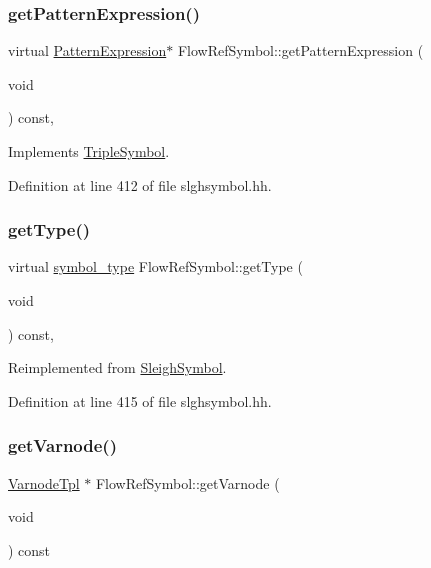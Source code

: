 \subsubsection{\texorpdfstring{getPatternExpression()}{getPatternExpression()}}
{\footnotesize\ttfamily virtual \mbox{\hyperlink{class_pattern_expression}{Pattern\+Expression}}$\ast$ Flow\+Ref\+Symbol\+::get\+Pattern\+Expression (\begin{DoxyParamCaption}\item[{void}]{ }\end{DoxyParamCaption}) const\hspace{0.3cm}{\ttfamily [inline]}, {\ttfamily [virtual]}}



Implements \mbox{\hyperlink{class_triple_symbol_a213895658c5fe547edf9ac54a1d2de2e}{Triple\+Symbol}}.



Definition at line 412 of file slghsymbol.\+hh.

\mbox{\label{class_flow_ref_symbol_a2cd681712810c2759731035c81aefd36}} 
\subsubsection{\texorpdfstring{getType()}{getType()}}
{\footnotesize\ttfamily virtual \mbox{\hyperlink{class_sleigh_symbol_aba70f7f332fd63488c5ec4bd7807db41}{symbol\+\_\+type}} Flow\+Ref\+Symbol\+::get\+Type (\begin{DoxyParamCaption}\item[{void}]{ }\end{DoxyParamCaption}) const\hspace{0.3cm}{\ttfamily [inline]}, {\ttfamily [virtual]}}



Reimplemented from \mbox{\hyperlink{class_sleigh_symbol_a2f6e5903e461084c29f95ea024883950}{Sleigh\+Symbol}}.



Definition at line 415 of file slghsymbol.\+hh.

\mbox{\label{class_flow_ref_symbol_af5c2756a1ef4ef4a7bc454a328275d73}} 
\subsubsection{\texorpdfstring{getVarnode()}{getVarnode()}}
{\footnotesize\ttfamily \mbox{\hyperlink{class_varnode_tpl}{Varnode\+Tpl}} $\ast$ Flow\+Ref\+Symbol\+::get\+Varnode (\begin{DoxyParamCaption}\item[{void}]{ }\end{DoxyParamCaption}) const\hspace{0.3cm}{\ttfamily [virtual]}}



